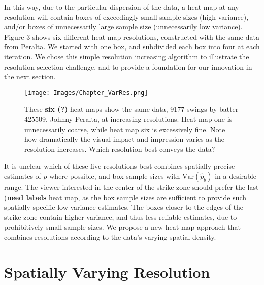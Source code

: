 In this way, due to the particular dispersion of the data, a heat map at any resolution will contain boxes of exceedingly small sample sizes (high variance), and/or boxes of unnecessarily large sample size (unnecessarily low variance). Figure 3 shows six different heat map resolutions, constructed with the same data from Peralta. We started with one box, and subdivided each box into four at each iteration. We chose this simple resolution increasing algorithm to illustrate the resolution selection challenge, and to provide a foundation for our innovation in the next section. 
        \begin{figure}[H]
      	\centering
      	\texttt{[image: Images/Chapter\_VarRes.png]} 
      	\caption{These {\bf six (?)} heat maps show the same data, 9177 swings by batter 425509, Johnny Peralta, at increasing resolutions. Heat map one is unnecessarily coarse, while heat map six is excessively fine. Note how dramatically the visual impact and impression varies as the resolution increases. Which resolution best conveys the data?}
      	\end{figure} 

It is unclear which of these five resolutions best combines spatially precise estimates of $p$ where possible, and box sample sizes with $\text{Var}(\hat{p}_{b})$ in a desirable range. The viewer interested in the center of the strike zone should prefer the last ({\bf need labels} heat map, as the box sample sizes are sufficient to provide such spatially specific low variance estimates. The boxes closer to the edges of the strike zone contain higher variance, and thus less reliable estimates, due to prohibitively small sample sizes. We propose a new heat map approach that combines resolutions according to the data's varying spatial density.

\section{Spatially Varying Resolution} %

